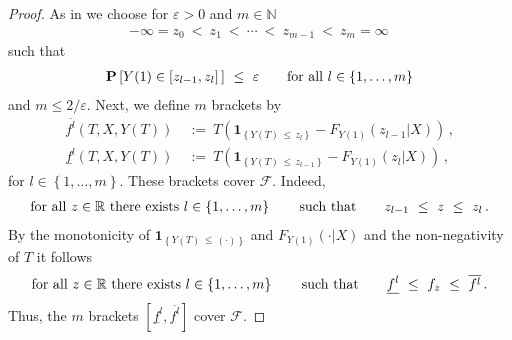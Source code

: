\begin{proof}
  As in \cite[Example~19.6]{Vaart2000}
  we choose for
  $\varepsilon>0$ and $m\in\mathbb{N}$
  \begin{gather*}
  -\infty=z_0\ <\ z_1\ <\ \cdots\ <\ z_{m-1}\ <\ z_m=\infty
  \,
  \end{gather*}
  such that
  \begin{gather}
    \label{size_z}
    \P
    \left[ 
      Y(1)\in \left[ z_{l-1},z_l \right]\,
    \right]
    \ 
    \le
    \ 
    \varepsilon
    \qquad
    \text{for all}\ 
    l\in \left\{ 1,\ldots,m \right\}
  \end{gather}
  and $m \le 2/\varepsilon$.
  Next, we define $m$ brackets by
\begin{align*}
  \overline{f^l}
  (T,X,Y(T))
  &
  \ 
  :=
  \ 
      T
      \left( 
        \mathbf{1}
        _{\left\{  Y(T)\,\le\,z_{l} \right\}}
        -
        F_{Y(1)}(z_{l-1}|X)
      \right)
      \,,
      \\
  \underline{f^l}
  (T,X,Y(T))
  &
  \ 
  :=
  \ 
      T
      \left( 
        \mathbf{1}
        _{\left\{  Y(T)\,\le\,z_{l-1} \right\}}
        -
        F_{Y(1)}(z_l|X)
      \right)
      \,,
\end{align*}
for $l\in \left\{ 1,\ldots,m \right\}$.
These brackets cover $\mathcal{F}$.
Indeed,
\begin{gather*}
  \text{for all}\ 
  z\in\R
  \ 
  \text{there exists} \ 
l\in \left\{ 1,\ldots,m \right\}
\qquad 
\text{such that}\qquad
z_{l-1}
\ 
\le
\ 
z
\ 
\le
\ 
z_l
\,.
\end{gather*}
By the monotonicity of 
$
        \mathbf{1}
      _{\left\{  Y(T)\,\le\,(\cdot) \right\}}
$
and
$
        F_{Y(1)}(\cdot|X)
$
and the non-negativity of $T$ it follows
\begin{gather*}
  \text{for all}\ 
  z\in\R
  \ 
  \text{there exists} \ 
l\in \left\{ 1,\ldots,m \right\}
\qquad 
\text{such that}\qquad
  \underline{f^l}
  \ 
  \le
  \ 
  f_z
  \ 
  \le
  \ 
  \overline{f^l}
  \,.
\end{gather*}
Thus, the $m$ brackets 
$
[
  \underline{f^l}
  ,
  \overline{f^l}
]
$
cover $\mathcal{F}$.


\end{proof}
